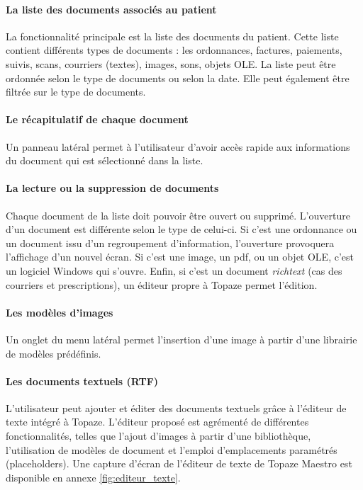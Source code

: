 \paragraph*{La liste des documents associés au patient\\}
La fonctionnalité principale est la liste des documents du patient. Cette liste contient différents types de documents : les ordonnances, factures, paiements, suivis, scans, courriers (textes), images, sons, objets \gls{OLE}. La liste peut être ordonnée selon le type de documents ou selon la date. Elle peut également être filtrée sur le type de documents.

\paragraph*{Le récapitulatif de chaque document\\}
Un panneau latéral permet à l'utilisateur d'avoir accès rapide aux informations du document qui est sélectionné dans la liste.

\paragraph*{La lecture ou la suppression de documents\\}
Chaque document de la liste doit pouvoir être ouvert ou supprimé.
L'ouverture d'un document est différente selon le type de celui-ci. Si c'est une ordonnance ou un document issu d'un regroupement d'information, l'ouverture provoquera l'affichage d'un nouvel écran. Si c'est une image, un pdf, ou un objet OLE, c'est un logiciel Windows qui s'ouvre. Enfin, si c'est un document \textit{richtext} (cas des courriers et prescriptions), un éditeur propre à Topaze permet l'édition. 

\paragraph*{Les modèles d'images\\}
Un onglet du menu latéral permet l'insertion d'une image à partir d'une librairie de modèles prédéfinis.

\paragraph*{Les documents textuels (\gls{RTF})\\}
L'utilisateur peut ajouter et éditer des documents textuels grâce à l'éditeur de texte intégré à Topaze. 
L'éditeur proposé est agrémenté de différentes fonctionnalités, telles que l'ajout d'images à partir d'une bibliothèque, l'utilisation de modèles de document et l'emploi d'emplacements paramétrés (placeholders).
Une capture d'écran de l'éditeur de texte de Topaze Maestro est disponible en annexe \ref{fig:editeur_texte}.


